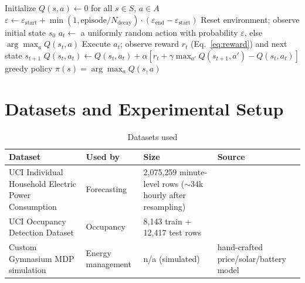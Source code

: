 \documentclass[11pt,a4paper]{article}
\begin{document}
\begin{algorithm}[htbp]
\caption{Tabular Q-learning for the home energy management MDP}
\label{alg:qlearning}
\begin{algorithmic}[1]
\State Initialize $Q(s,a) \gets 0$ for all $s \in S,\, a \in A$
  \State $\varepsilon \gets \varepsilon_{\text{start}} + \min(1, \text{episode}/N_{\text{decay}}) \cdot (\varepsilon_{\text{end}} - \varepsilon_{\text{start}})$
  \State Reset environment; observe initial state $s_0$
    \State $a_t \gets$ a uniformly random action with probability $\varepsilon$, else $\arg\max_{a} Q(s_t, a)$
    \State Execute $a_t$; observe reward $r_t$ (Eq.~\eqref{eq:reward}) and next state $s_{t+1}$
    \State $Q(s_t,a_t) \gets Q(s_t,a_t) + \alpha\left[r_t + \gamma \max_{a'} Q(s_{t+1},a') - Q(s_t,a_t)\right]$
  \EndFor
\EndFor
\State \Return greedy policy $\pi(s) = \arg\max_{a} Q(s,a)$
\end{algorithmic}
\end{algorithm}

\FloatBarrier
\section{Datasets and Experimental Setup}

\begin{table}[htbp]
\centering
\caption{Datasets used}
\label{tab:datasets}
\footnotesize
\renewcommand{\arraystretch}{1.3}
\begin{tabular}{@{}p{4.3cm}p{2.3cm}p{3.6cm}p{2.4cm}@{}}
\toprule
\rowcolor{tablehead}
\textbf{Dataset} & \textbf{Used by} & \textbf{Size} & \textbf{Source} \\
\midrule
UCI Individual Household Electric Power Consumption & Forecasting & 2{,}075{,}259 minute-level rows ($\sim$34k hourly after resampling) & \citet{hebrail2012} \\
UCI Occupancy Detection Dataset & Occupancy & 8{,}143 train + 12{,}417 test rows & \citet{candanedo2016} \\
Custom Gymnasium MDP simulation & Energy management & n/a (simulated) & hand-crafted price/solar/battery model \\
\bottomrule
\end{tabular}
\renewcommand{\arraystretch}{1}
\end{table}
\end{document}
